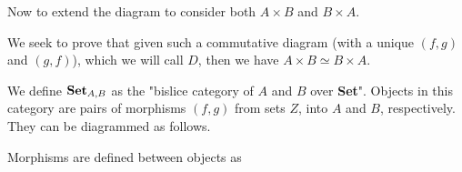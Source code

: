 \documentclass[12pt, letterpaper, twoside]{report}
\begin{document}
Now to extend the diagram to consider both $A \times B$ and $B \times A$.


We seek to prove that given such a commutative diagram (with a unique $(f,g)$ and $(g,f)$), which we will call $D$, then we have $A \times B \simeq B \times A$.

We define $\text{\textbf{Set}}_{A,B}$ as the "bislice category of $A$ and $B$ over \textbf{Set}". Objects in this category are pairs of morphisms $(f,g)$ from sets $Z$, into $A$ and $B$, respectively. They can be diagrammed as follows.


Morphisms are defined between objects as
\end{document}
